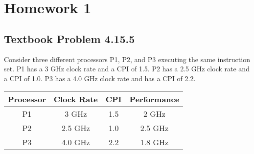 \documentclass[12pt]{article}
\begin{document}
\section{Homework 1}
\subsection{Textbook Problem 4.15.5}
Consider three different processors P1, P2, and P3 executing the same instruction set. 
P1 has a 3 GHz clock rate and a CPI of 1.5. P2 has a 2.5 GHz clock rate and a CPI of 1.0. 
P3 has a 4.0 GHz clock rate and has a CPI of 2.2.

\begin{center}
    \begin{tabular}{|c|c|c|c|}
        \hline
        Processor & Clock Rate & CPI & Performance \\
        \hline
        P1 & 3 GHz & 1.5 & 2 GHz \\
        \hline
        P2 & 2.5 GHz & 1.0 & 2.5 GHz \\
        \hline
        P3 & 4.0 GHz & 2.2 & 1.8 GHz \\
        \hline
    \end{tabular}
\end{center}
\end{document}
